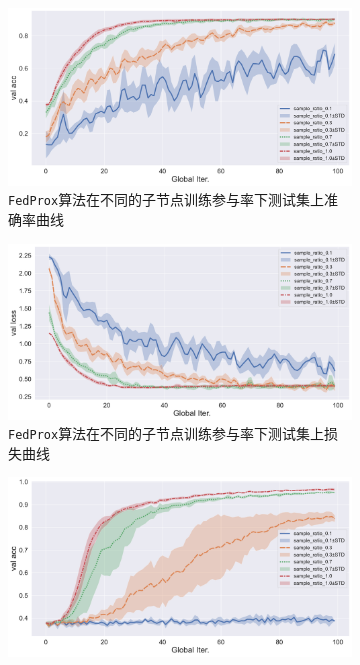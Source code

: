 \begin{figure}[H]
\centering
\begin{subfigure}{.5\textwidth}
  \centering
  \includegraphics[width=.95\linewidth]{figures/fedprox-compare-sample-ratio-val-acc.pdf}
  \caption{\texttt{FedProx}算法在不同的子节点训练参与率下测试集上准确率曲线}
  \label{fig:fedprox-compare-sample-ratio-val-acc}
\end{subfigure}%
\begin{subfigure}{.5\textwidth}
  \centering
  \includegraphics[width=.95\linewidth]{figures/fedprox-compare-sample-ratio-val-loss.pdf}
  \caption{\texttt{FedProx}算法在不同的子节点训练参与率下测试集上损失曲线}
  \label{fig:fedprox-compare-sample-ratio-val-loss}
\end{subfigure}
\begin{subfigure}{.5\textwidth}
  \centering
  \includegraphics[width=.95\linewidth]{figures/proxskip-compare-sample-ratio-val-acc.pdf}

\end{subfigure}
\end{figure}
